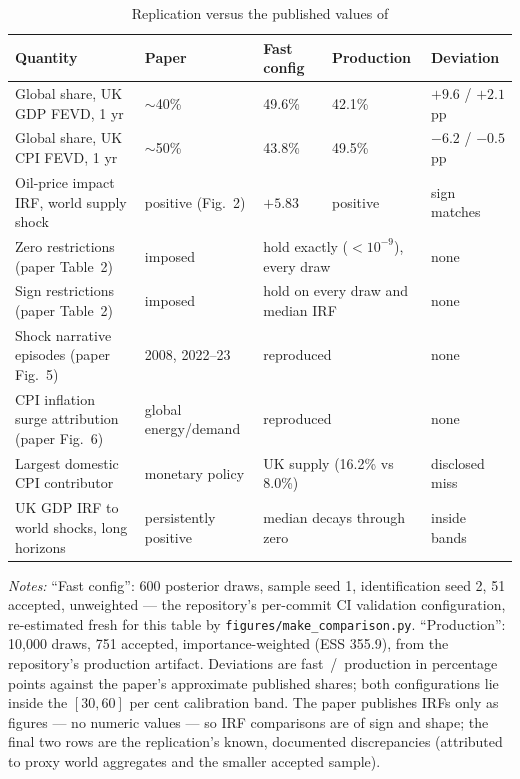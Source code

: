 \begin{table}[t]
\centering
\caption{Replication versus the published values of \citet{brignone2025}}
\label{tab:pubcompare}
\footnotesize
\begin{tabularx}{\textwidth}{@{}>{\raggedright\arraybackslash}Xllll@{}}
\toprule
Quantity & Paper & Fast config & Production & Deviation \\
\midrule
Global share, UK GDP FEVD, 1 yr & $\sim$40\% & 49.6\% & 42.1\% & $+9.6$ / $+2.1$ pp \\
Global share, UK CPI FEVD, 1 yr & $\sim$50\% & 43.8\% & 49.5\% & $-6.2$ / $-0.5$ pp \\
Oil-price impact IRF, world supply shock & positive (Fig.~2) & $+5.83$ & positive & sign matches \\
Zero restrictions (paper Table~2) & imposed & \multicolumn{2}{l}{hold exactly ($<10^{-9}$), every draw} & none \\
Sign restrictions (paper Table~2) & imposed & \multicolumn{2}{l}{hold on every draw and median IRF} & none \\
Shock narrative episodes (paper Fig.~5) & 2008, 2022--23 & \multicolumn{2}{l}{reproduced} & none \\
CPI inflation surge attribution (paper Fig.~6) & global energy/demand & \multicolumn{2}{l}{reproduced} & none \\
Largest domestic CPI contributor & monetary policy & \multicolumn{2}{l}{UK supply (16.2\% vs 8.0\%)} & disclosed miss \\
UK GDP IRF to world shocks, long horizons & persistently positive & \multicolumn{2}{l}{median decays through zero} & inside bands \\
\bottomrule
\end{tabularx}
\par\smallskip
\parbox{0.97\textwidth}{\footnotesize \emph{Notes:} ``Fast config'': 600 posterior draws, sample seed 1, identification seed 2, 51 accepted, unweighted --- the repository's per-commit CI validation configuration, re-estimated fresh for this table by \texttt{figures/make\_comparison.py}. ``Production'': 10{,}000 draws, 751 accepted, importance-weighted (ESS 355.9), from the repository's production artifact. Deviations are fast~/~production in percentage points against the paper's approximate published shares; both configurations lie inside the $[30,60]$ per cent calibration band. The paper publishes IRFs only as figures --- no numeric values --- so IRF comparisons are of sign and shape; the final two rows are the replication's known, documented discrepancies (attributed to proxy world aggregates and the smaller accepted sample).}
\end{table}

